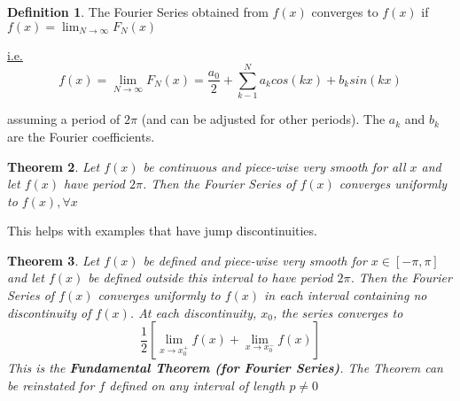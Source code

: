 \documentclass[12pt]{article}
\theoremstyle{plain}
\newtheorem{theorem}{Theorem}[section]
\theoremstyle{definition}
\newtheorem{definition}[theorem]{Definition}
\begin{document}
\begin{definition}
	The Fourier Series obtained from $f(x)$ converges to $f(x)$ if $f(x) = \lim_{N\to\infty} F_N (x)$
	
	\underline{i.e.} $$f(x) = \lim_{N\to\infty} F_N (x) = \frac{a_0}{2}+ \sum^N_{k-1} a_k cos(kx) + b_k sin(kx)$$
	
	assuming a period of $2\pi$ (and can be adjusted for other periods). The $a_k$ and $b_k$ are the Fourier coefficients.
\end{definition}

\begin{theorem}
	Let $f(x)$ be continuous and piece-wise very smooth for all $x$ and let $f(x)$ have period $2\pi$. Then the Fourier Series of $f(x)$ converges uniformly to $f(x), \forall x$
\end{theorem}

This helps with examples that have jump discontinuities.

\begin{theorem}
	Let $f(x)$ be defined and piece-wise very smooth for $x\in[-\pi,\pi]$ and let $f(x)$ be defined outside this interval to have period $2\pi$. Then the Fourier Series of $f(x)$ converges uniformly to $f(x)$ in each interval containing no discontinuity of $f(x)$. At each discontinuity, $x_0$, the series converges to
	$$\frac{1}{2} [\lim_{x\to x_0^+} f(x) + \lim_{x\to x_0^-} f(x)]$$
	This is the \textbf{Fundamental Theorem (for Fourier Series)}. The Theorem can be reinstated for $f$ defined on any interval of length $p\neq 0$
\end{theorem}
\end{document}
